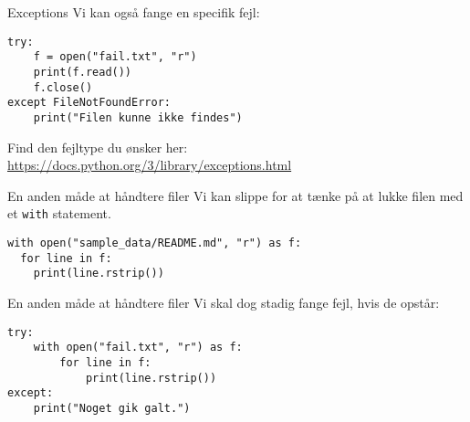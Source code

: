 \begin{frame}[fragile]{Exceptions}
	Vi kan også fange en specifik fejl:
	\begin{lstlisting}[style=python]
try:
	f = open("fail.txt", "r")
	print(f.read())
	f.close()
except FileNotFoundError:
	print("Filen kunne ikke findes")
	\end{lstlisting}

\pause

Find den fejltype du ønsker her: 
\url{https://docs.python.org/3/library/exceptions.html}
\end{frame}


\begin{frame}[fragile]{En anden måde at håndtere filer}
Vi kan slippe for at tænke på at lukke filen med et \texttt{with} statement.

\begin{lstlisting}[style=python]
with open("sample_data/README.md", "r") as f:
  for line in f:
    print(line.rstrip())
\end{lstlisting}

\end{frame}

\begin{frame}[fragile]{En anden måde at håndtere filer}
Vi skal dog stadig fange fejl, hvis de opstår:

\begin{lstlisting}[style=python]
try:
	with open("fail.txt", "r") as f:
		for line in f:
			print(line.rstrip())
except:
	print("Noget gik galt.")
\end{lstlisting}

\end{frame}


